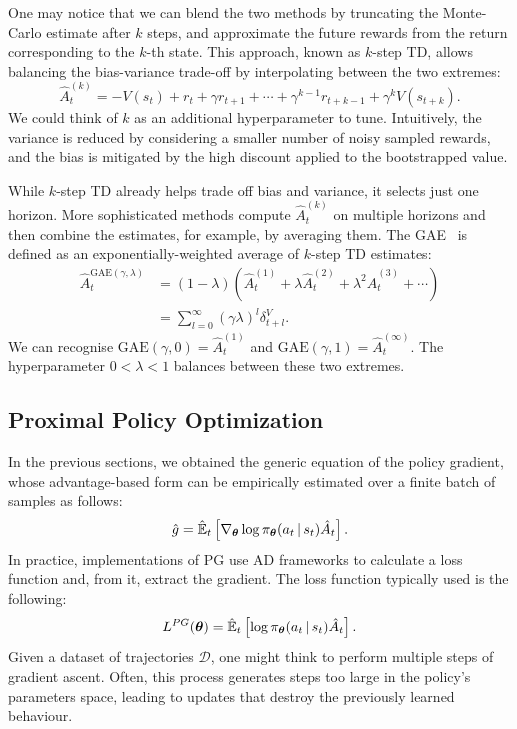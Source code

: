 One may notice that we can blend the two methods by truncating the Monte-Carlo estimate after $k$ steps, and approximate the future rewards from the return corresponding to the $k$-th state.
This approach, known as $k$-step TD, allows balancing the bias-variance trade-off by interpolating between the two extremes:
%
\begin{equation*}
    \hat{A}_t^{(k)} = -V(s_t) + r_t + \gamma r_{t+1} + \cdots + \gamma^{k-1} r_{t+k-1} + \gamma^k V(s_{t+k}) .
\end{equation*}
%
We could think of $k$ as an additional hyperparameter to tune.
Intuitively, the variance is reduced by considering a smaller number of noisy sampled rewards, and the bias is mitigated by the high discount applied to the bootstrapped value.

While $k$-step TD already helps trade off bias and variance, it selects just one horizon.
More sophisticated methods compute $\hat{A}_t^{(k)}$ on multiple horizons and then combine the estimates, for example, by averaging them.
The \ac{GAE}~\parencite{schulman_high-dimensional_2018} is defined as an exponentially-weighted average of $k$-step TD estimates:
%
\begin{align*}
    \hat{A}_t^{\text{GAE}(\gamma, \lambda)} 
    &= (1 - \lambda) \left( \hat{A}_t^{(1)} + \lambda \hat{A}_t^{(2)} + \lambda^2 \hat{A}_t^{(3)} + \cdots \right) \\
    &= \sum_{l=0}^{\infty} (\gamma \lambda)^l \delta^V_{t+l}
    .
\end{align*}
%
We can recognise $\text{GAE}(\gamma, 0) = \hat{A}_t^{(1)}$ and $\text{GAE}(\gamma, 1) = \hat{A}_t^{(\infty)}$.
The hyperparameter $0 < \lambda < 1$ balances between these two extremes.

\subsection{Proximal Policy Optimization}
\label{sec:ppo}

In the previous sections, we obtained the generic equation of the policy gradient, whose advantage-based form can be empirically estimated over a finite batch of samples as follows:
%
\begin{equation*}
    \hat{g} = \hat{\operatorname*{\mathbb{E}}}_t \left[ \nabla_{\boldsymbol{\theta}} \log \pi_{\boldsymbol{\theta}}(a_t \operatorname{\mid} s_t) \hat{A}_t \right] .
\end{equation*}
%
In practice, implementations of \ac{PG} use \acl{AD} frameworks to calculate a loss function and, from it, extract the gradient.
The loss function typically used is the following:
%
\begin{equation}
    \label{equation:policy_gradient_loss_advantage}
    L^{PG}(\boldsymbol{\theta}) = \hat{\operatorname*{\mathbb{E}}}_t \left[ \log \pi_{\boldsymbol{\theta}}(a_t \operatorname{\mid} s_t) \hat{A}_t \right] .
\end{equation}
%
Given a dataset of trajectories $\mathcal{D}$, one might think to perform multiple steps of gradient ascent.
Often, this process generates steps too large in the policy's parameters space, leading to updates that destroy the previously learned behaviour.

